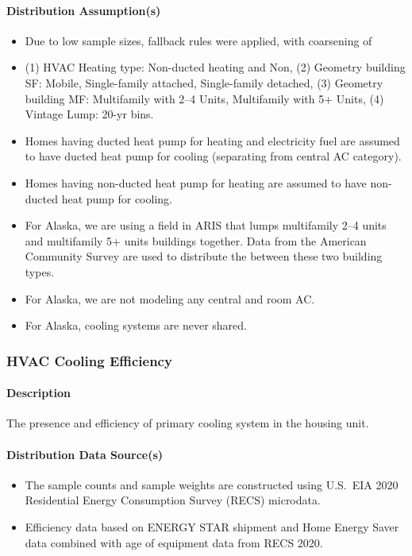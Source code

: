 \paragraph{Distribution Assumption(s)}
\begin{itemize}
    \item Due to low sample sizes, fallback rules were applied, with coarsening of
    \item (1) HVAC Heating type: Non-ducted heating and Non, (2) Geometry building SF: Mobile, Single-family attached, Single-family detached, (3) Geometry building MF: Multifamily with 2--4 Units, Multifamily with 5+ Units, (4) Vintage Lump: 20-yr bins. 
    \item Homes having ducted heat pump for heating and electricity fuel are assumed to have ducted heat pump for cooling (separating from central AC category).
    \item Homes having non-ducted heat pump for heating are assumed to have non-ducted heat pump for cooling.
    \item For Alaska, we are using a field in ARIS that lumps multifamily 2--4 units and multifamily 5+ units buildings together. Data from the American Community Survey are used to distribute the between these two building types.
    \item For Alaska, we are not modeling any central and room AC.
    \item For Alaska, cooling systems are never shared.
\end{itemize}
 
\subsubsection{HVAC Cooling Efficiency}
\paragraph{Description}
The presence and efficiency of primary cooling system in the housing unit.

\paragraph{Distribution Data Source(s)}
\begin{itemize}
    \item The sample counts and sample weights are constructed using U.S.~EIA 2020 Residential Energy Consumption Survey (RECS) microdata. 
    \item Efficiency data based on ENERGY STAR shipment and Home Energy Saver data combined with age of equipment data from RECS 2020.
\end{itemize}

